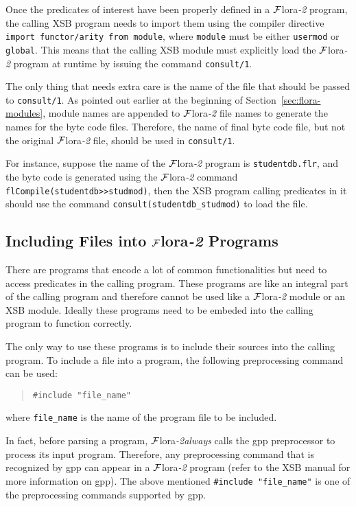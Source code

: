 \documentclass[11pt]{article}
\newcommand{\FLORA}{{\mbox{${\cal F}${\sc lora}\rm\emph{-2}}}\xspace}
\begin{document}
Once the predicates of interest have been properly defined in a \FLORA
program, the calling XSB program needs to import them using the
compiler directive \mbox{\tt import functor/arity from module}, where
{\tt module} must be either {\tt usermod} or {\tt global}. This means
that the calling XSB module must explicitly load the \FLORA program 
at runtime by issuing the command {\tt consult/1}.

%
The only thing that needs extra care is the name of the file that
should be passed to \mbox{\tt consult/1}. As pointed out earlier at
the beginning of Section~\ref{sec:flora-modules}, module names are
appended to \FLORA file names to generate the names for the byte code
files. Therefore, the name of final byte code file, but not the
original \FLORA file, should be used in {\tt consult/1}.

For instance, suppose the name of the \FLORA program is
{\tt studentdb.flr}, and the byte code is generated using the \FLORA
command {\tt flCompile(studentdb>>studmod)}, then the XSB program
calling predicates in it should use the command
\verb|consult(studentdb_studmod)| to load the file.


\subsection{Including Files into \FLORA Programs}


There are programs that encode a lot of common functionalities but
need to access predicates in the calling program. These programs are
like an integral part of the calling program and therefore cannot be
used like a \FLORA module or an XSB module. Ideally these programs
need to be embeded into the calling program to function correctly.

%
The only way to use these programs is to include their sources into
the calling program. To include a file into a program, the following
preprocessing command can be used:
\begin{quote}
\verb|#include "file_name"|
\end{quote}
where \verb|file_name| is the name of the program file to be included.

In fact, before parsing a program, \FLORA \emph{always} calls the
{\sf gpp} preprocessor to process its input program. Therefore, any
preprocessing command that is recognized by {\sf gpp} can appear in
a \FLORA program (refer to the XSB manual for more information on
{\sf gpp}). The above mentioned \verb|#include "file_name"| is one
of the preprocessing commands supported by {\sf gpp}.
\end{document}
